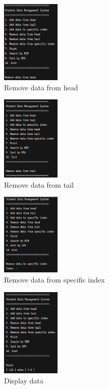 \documentclass[12pt,titlepage]{article}
\begin{document}
\begin{enumerate}
{        \pagebreak

        \begin{figure}[h]
            \centering
            \includegraphics[width=0.25\textwidth]{./images/4-4.png}
            \caption{Remove data from head}
        \end{figure}

        \begin{figure}[h]
            \centering
            \includegraphics[width=0.25\textwidth]{./images/4-5.png}
            \caption{Remove data from tail}
        \end{figure}

        \pagebreak

        \begin{figure}[h]
            \centering
            \includegraphics[width=0.25\textwidth]{./images/4-6.png}
            \caption{Remove data from specific index}
        \end{figure}

        \begin{figure}[h]
            \centering
            \includegraphics[width=0.25\textwidth]{./images/4-7.png}
            \caption{Display data}
        \end{figure}

}
\end{enumerate}
\end{document}

